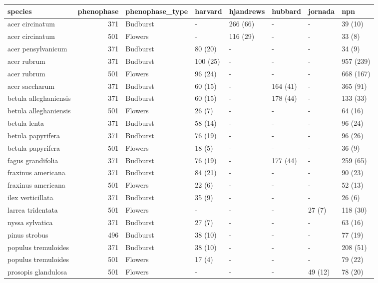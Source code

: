 \documentclass[a4paper,12pt]{article}
\begin{document}
\begin{table}
\tiny
\begin{tabular}{l|r|l|l|l|l|l|l}
\hline
species & phenophase & phenophase\_type & harvard & hjandrews & hubbard & jornada & npn\\
\hline
acer circinatum & 371 & Budburst & - & 266 (66) & - & - & 39 (10)\\
\hline
acer circinatum & 501 & Flowers & - & 116 (29) & - & - & 33 (8)\\
\hline
acer pensylvanicum & 371 & Budburst & 80 (20) & - & - & - & 34 (9)\\
\hline
acer rubrum & 371 & Budburst & 100 (25) & - & - & - & 957 (239)\\
\hline
acer rubrum & 501 & Flowers & 96 (24) & - & - & - & 668 (167)\\
\hline
acer saccharum & 371 & Budburst & 60 (15) & - & 164 (41) & - & 365 (91)\\
\hline
betula alleghaniensis & 371 & Budburst & 60 (15) & - & 178 (44) & - & 133 (33)\\
\hline
betula alleghaniensis & 501 & Flowers & 26 (7) & - & - & - & 64 (16)\\
\hline
betula lenta & 371 & Budburst & 58 (14) & - & - & - & 96 (24)\\
\hline
betula papyrifera & 371 & Budburst & 76 (19) & - & - & - & 96 (26)\\
\hline
betula papyrifera & 501 & Flowers & 18 (5) & - & - & - & 36 (9)\\
\hline
fagus grandifolia & 371 & Budburst & 76 (19) & - & 177 (44) & - & 259 (65)\\
\hline
fraxinus americana & 371 & Budburst & 84 (21) & - & - & - & 90 (23)\\
\hline
fraxinus americana & 501 & Flowers & 22 (6) & - & - & - & 52 (13)\\
\hline
ilex verticillata & 371 & Budburst & 35 (9) & - & - & - & 26 (6)\\
\hline
larrea tridentata & 501 & Flowers & - & - & - & 27 (7) & 118 (30)\\
\hline
nyssa sylvatica & 371 & Budburst & 27 (7) & - & - & - & 63 (16)\\
\hline
pinus strobus & 496 & Budburst & 38 (10) & - & - & - & 77 (19)\\
\hline
populus tremuloides & 371 & Budburst & 38 (10) & - & - & - & 208 (51)\\
\hline
populus tremuloides & 501 & Flowers & 17 (4) & - & - & - & 79 (22)\\
\hline
prosopis glandulosa & 501 & Flowers & - & - & - & 49 (12) & 78 (20)\\

\end{tabular}
\end{table}
\end{document}
